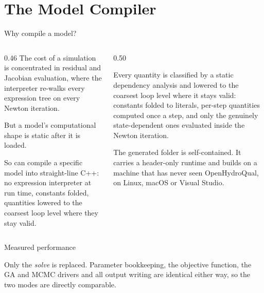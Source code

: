 \documentclass[aspectratio=169, 10pt]{beamer}
\begin{document}
\section{The Model Compiler}

\begin{frame}{Why compile a model?}
  \begin{columns}[T,onlytextwidth]
    \begin{column}{0.46\textwidth}
      The cost of a simulation is concentrated in residual and Jacobian
      evaluation, where the interpreter re-walks every expression tree on every
      Newton iteration.

      \vspace{0.5em}
      But a model's computational shape is \alert{static after it is loaded}.

      \vspace{0.5em}
      So \ohq{} can \alert{compile a specific model} into straight-line C++:
      no expression interpreter at run time, constants folded, quantities
      lowered to the coarsest loop level where they stay valid.
    \end{column}
    \begin{column}{0.50\textwidth}
      {\footnotesize
      Every quantity is classified by a static dependency analysis and lowered
      to the coarsest loop level where it stays valid: constants folded to
      literals, per-step quantities computed once a step, and only the
      genuinely state-dependent ones evaluated inside the Newton iteration.

      \vspace{0.6em}
      The generated folder is self-contained. It carries a header-only runtime
      and builds on a machine that has never seen OpenHydroQual, on Linux,
      macOS or Visual Studio.}
    \end{column}
  \end{columns}
\end{frame}

\begin{frame}{Measured performance}
  \centering
  \setlength{\figslotmaxht}{0.78\textheight}
  \vspace{-0.4em}
  \parbox{\textwidth}{\scriptsize Only the \emph{solve} is replaced. Parameter
  bookkeeping, the objective function, the GA and MCMC drivers and all output
  writing are identical either way, so the two modes are
  \alert{directly comparable}.}
\end{frame}
\end{document}
